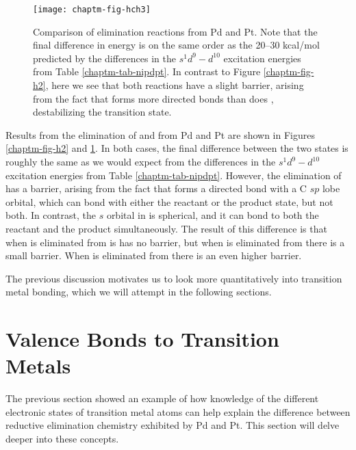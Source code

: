 \begin{figure}
\begin{center}
\texttt{[image: chaptm-fig-hch3]}
\end{center}
\caption{Comparison of  elimination reactions from Pd and
  Pt. Note that the final difference in energy is on the same order as
  the 20--30 kcal/mol predicted by the differences in the
  $s^1d^9-d^{10}$ excitation energies from Table
  \ref{chaptm-tab-nipdpt}. In contrast to Figure \ref{chaptm-fig-h2},
  here we see that both reactions have a slight barrier, arising from
  the fact that  forms more directed bonds than does
  , destabilizing the transition state.}
\label{chaptm-fig-hch3}
\end{figure}

Results from the elimination of  and  from Pd and
Pt are shown in Figures \ref{chaptm-fig-h2} and
\ref{chaptm-fig-hch3}. In both cases, the final difference between the
two states is roughly the same as we would expect from the differences
in the $s^1d^9-d^{10}$ excitation energies from Table
\ref{chaptm-tab-nipdpt}. However, the elimination of  has a
barrier, arising from the fact that  forms a directed bond
with a C $sp$ lobe orbital, which can bond with either the reactant or
the product state, but not both. In contrast, the $s$ orbital in
 is spherical, and it can bond to both the reactant and the
product simultaneously. The result of this difference is that when
 is eliminated from  is has no barrier,
but when  is eliminated from  there
is a small barrier. When  is eliminated from
 there is an even higher barrier.

The previous discussion motivates us to look more quantitatively into
transition metal bonding, which we will attempt in the following
sections. 

\section{Valence Bonds to Transition Metals}
The previous section showed an example of how knowledge of the
different electronic states of transition metal atoms can help explain
the difference between reductive elimination chemistry exhibited by Pd
and Pt. This section will delve deeper into these concepts.

